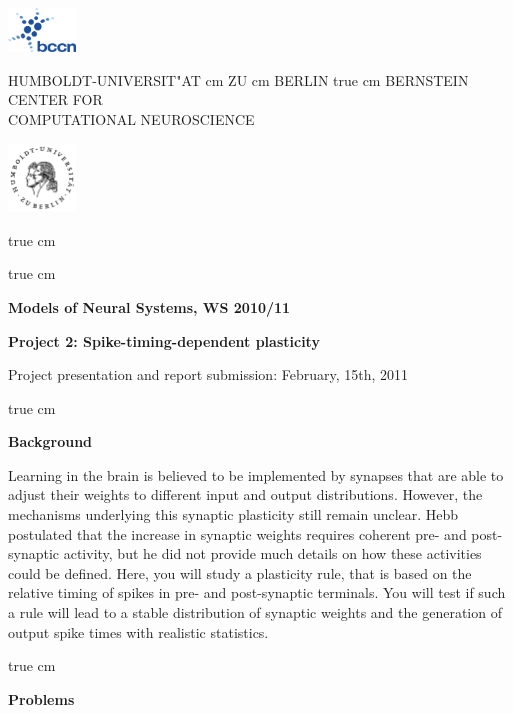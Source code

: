 \documentclass[12pt]{article}
\begin{document}
\parbox{2cm}{
\includegraphics[width=1.8cm]{../bccnlogo.pdf}
}
\parbox{11cm}{
\begin{center}
\large HUMBOLDT-UNIVERSIT"AT  cm ZU  cm BERLIN
 true cm
\mgross BERNSTEIN CENTER FOR\\ COMPUTATIONAL NEUROSCIENCE
\end{center}
}
\parbox{2cm}
{
\hfill
\includegraphics[width=1.8cm]{../hublogo.pdf}
}

 true cm



 true cm
\centerline{\bf Models of Neural Systems, WS 2010/11}
\centerline{\bf Project 2: Spike-timing-dependent plasticity}
\centerline{Project presentation and report submission: February,
15th, 2011}

 true cm

{\bf Background}

Learning in the brain is believed to be implemented by synapses that are
able to adjust their weights to different input and output
distributions. However, the mechanisms underlying this synaptic
plasticity still remain unclear. Hebb postulated that the increase in
synaptic weights requires coherent pre- and post-synaptic activity,
but he did not provide much details on how these activities could be
defined. Here, you will study a plasticity rule, that is based on the relative
timing of spikes in pre- and post-synaptic terminals. You will test if such
a rule will lead to a stable distribution of synaptic weights and the
generation of output spike times with realistic statistics.

 true cm

{\bf Problems}
\end{document}
